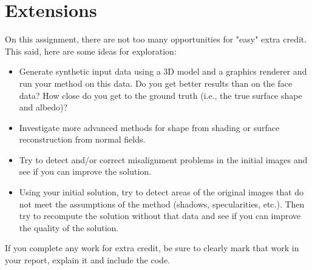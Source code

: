 \documentclass[10pt,letterpaper]{article}
\begin{document}
\newpage
\section{Extensions}

On this assignment, there are not too many opportunities for "easy" extra credit. This said, here are some ideas for exploration:
\begin{itemize}
\item Generate synthetic input data using a 3D model and a graphics renderer and run your method on this data. Do you get better results than on the face data? How close do you get to the ground truth (i.e., the true surface shape and albedo)?
\item Investigate more advanced methods for shape from shading or surface reconstruction from normal fields.
\item Try to detect and/or correct misalignment problems in the initial images and see if you can improve the solution.
\item Using your initial solution, try to detect areas of the original images that do not meet the assumptions of the method (shadows, specularities, etc.). Then try to recompute the solution without that data and see if you can improve the quality of the solution.
\end{itemize}
If you complete any work for extra credit, be sure to clearly mark that work in your report, explain it and include the code.
\end{document}
